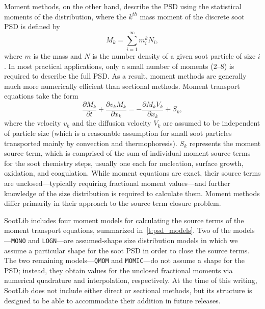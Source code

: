 \documentclass[preprint,letterpaper]{elsarticle}
\begin{document}
Moment methods, on the other hand, describe the PSD using the statistical moments of the distribution, where the $k^{th}$ mass moment of the discrete soot PSD is defined by
\begin{equation}
    M_k = \sum_{i=1}^{\infty} m_i^k N_i,
\end{equation}
where $m$ is the mass and $N$ is the number density of a given soot particle of size $i$. In most practical applications, only a small number of moments (2--8) is required to describe the full PSD. As a result, moment methods are generally much more numerically efficient than sectional methods. Moment transport equations take the form
\begin{equation}
    \label{e:momTransEq}
    \frac{\partial M_k}{\partial t} + \frac{\partial v_k M_k}{\partial x_k} = -\frac{\partial M_k V_k}{\partial x_k} + S_k,
\end{equation}
where the velocity $v_k$ and the diffusion velocity $V_k$ are assumed to be independent of particle size (which is a reasonable assumption for small soot particles transported mainly by convection and thermophoresis). $S_k$ represents the moment source term, which is comprised of the sum of individual moment source terms for the soot chemistry steps, usually one each for nucleation, surface growth, oxidation, and coagulation. While moment equations are exact, their source terms are unclosed---typically requiring fractional moment values---and further knowledge of the size distribution is required to calculate them. Moment methods differ primarily in their approach to the source term closure problem.

SootLib includes four moment models for calculating the source terms of the moment transport equations, summarized in~\ref{t:psd_models}. Two of the models---\texttt{MONO} and \texttt{LOGN}---are assumed-shape size distribution models in which we assume a particular shape for the soot PSD in order to close the source terms. The two remaining models---\texttt{QMOM} and \texttt{MOMIC}---do not assume a shape for the PSD; instead, they obtain values for the unclosed fractional moments via numerical quadrature and interpolation, respectively. At the time of this writing, SootLib does not include either direct or sectional methods, but its structure is designed to be able to accommodate their addition in future releases.
\end{document}
